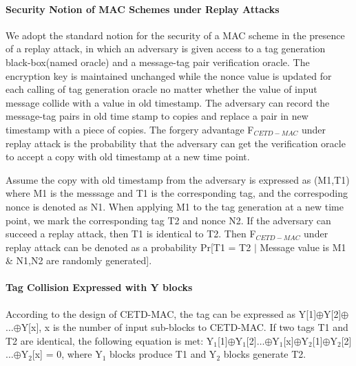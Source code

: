 \documentclass{article}
\begin{document}
\paragraph{Security Notion of MAC Schemes under Replay Attacks}
We adopt the standard notion for the security of a MAC scheme in the presence of a replay attack, in which an adversary is given  access to a tag generation black-box(named oracle) and a message-tag pair verification oracle. The encryption key is maintained unchanged while the nonce value is updated for each calling of tag generation oracle no matter whether the value of input message collide with a value in old timestamp. The adversary can record the message-tag pairs in old time stamp to copies and replace a pair in new timestamp with a piece of copies. The forgery advantage F$_{CETD-MAC}$ under replay attack is the probability that the adversary can get the verification oracle to accept a copy with old timestamp at a new time point. 

Assume the copy with old timestamp from the adversary is expressed as (M1,T1) where M1 is the messsage and T1 is the corresponding tag, and the correspoding nonce is denoted as N1. When applying M1 to the tag generation at a new time point, we mark the corresponding tag T2 and nonce N2. If the adversary can succeed a replay attack, then T1 is identical to T2.
Then F$_{CETD-MAC}$ under replay attack can be denoted as a probability Pr[T1 = T2  $\mid$ Message value is M1 \& N1,N2 are randomly generated]. 

\paragraph{Tag Collision Expressed with Y blocks}
According to the design of CETD-MAC, the tag can be expressed as Y[1]$\oplus$Y[2]$\oplus$$\ldots$$\oplus$Y[x], x is the number of input sub-blocks to CETD-MAC. If two tags T1 and T2 are identical, the following equation is met:
Y$_1$[1]$\oplus$Y$_1$[2]$\ldots$$\oplus$Y$_1$[x]$\oplus$Y$_2$[1]$\oplus$Y$_2$[2]$\ldots$$\oplus$Y$_2$[x] = 0, where Y$_1$ blocks produce T1 and Y$_2$ blocks generate T2.
\end{document}
